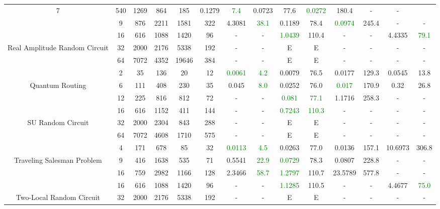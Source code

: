 \begin{table}[htb]
{\begin{tabular}{|c|c|c|c|c|c|c|c|c|c|c|c|c|c|}
7 & 540 & 1269 & 864 & 185
 & 0.1279 & \textcolor{green}{7.4}
 & 0.0723 & 77.6
 & \textcolor{green}{0.0272} & 180.4
 & - & -
 \\
 & 
9 & 876 & 2211 & 1581 & 322
 & 4.3081 & \textcolor{green}{38.1}
 & 0.1189 & 78.4
 & \textcolor{green}{0.0974} & 245.4
 & - & -
 \\
\hline
 & 
16 & 616 & 1088 & 1420 & 96
 & - & -
 & \textcolor{green}{1.0439} & 110.4
 & - & -
 & 4.4335 & \textcolor{green}{79.1}
 \\
Real Amplitude Random Circuit & 
32 & 2000 & 2176 & 5338 & 192
 & - & -
 & E & E
 & - & -
 & - & -
 \\
 & 
64 & 7072 & 4352 & 19646 & 384
 & - & -
 & E & E
 & - & -
 & - & -
 \\
\hline
 & 
2 & 35 & 136 & 20 & 12
 & \textcolor{green}{0.0061} & \textcolor{green}{4.2}
 & 0.0079 & 76.5
 & 0.0177 & 129.3
 & 0.0545 & 13.8
 \\
Quantum Routing & 
6 & 111 & 408 & 230 & 35
 & 0.045 & \textcolor{green}{8.0}
 & 0.0252 & 76.0
 & \textcolor{green}{0.017} & 170.9
 & 0.32 & 26.8
 \\
 & 
12 & 225 & 816 & 812 & 72
 & - & -
 & \textcolor{green}{0.081} & \textcolor{green}{77.1}
 & 1.1716 & 258.3
 & - & -
 \\
\hline
 & 
16 & 616 & 1152 & 411 & 144
 & - & -
 & \textcolor{green}{0.7243} & \textcolor{green}{110.3}
 & - & -
 & - & -
 \\
SU Random Circuit & 
32 & 2000 & 2304 & 843 & 288
 & - & -
 & E & E
 & - & -
 & - & -
 \\
 & 
64 & 7072 & 4608 & 1710 & 575
 & - & -
 & E & E
 & - & -
 & - & -
 \\
\hline
 & 
4 & 171 & 678 & 85 & 32
 & \textcolor{green}{0.0113} & \textcolor{green}{4.5}
 & 0.0263 & 77.0
 & 0.0136 & 157.1
 & 10.6973 & 306.8
 \\
Traveling Salesman Problem & 
9 & 416 & 1638 & 535 & 71
 & 0.5541 & \textcolor{green}{22.9}
 & \textcolor{green}{0.0729} & 78.3
 & 0.0807 & 228.8
 & - & -
 \\
 & 
16 & 759 & 2982 & 1166 & 128
 & 2.3466 & \textcolor{green}{58.7}
 & \textcolor{green}{1.2797} & 110.7
 & 23.5789 & 577.8
 & - & -
 \\
\hline
 & 
16 & 616 & 1088 & 1420 & 96
 & - & -
 & \textcolor{green}{1.1285} & 110.5
 & - & -
 & 4.4677 & \textcolor{green}{75.0}
 \\
Two-Local Random Circuit & 
32 & 2000 & 2176 & 5338 & 192
 & - & -
 & E & E
 & - & -
 & - & -
 \\

\end{tabular}}
\end{table}
